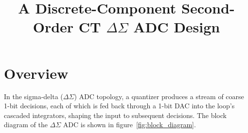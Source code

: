 \documentclass[12pt, a4paper]{article}
\title{A Discrete-Component Second-Order CT $\Delta\Sigma$ ADC Design}
\author{}
\date{}
\begin{document}
\maketitle
\tableofcontents
\newpage

\section{Overview}
\label{section:overview}

In the sigma-delta ($\Delta\Sigma$) ADC topology, a quantizer produces a stream of coarse 1-bit decisions, each of which is fed back through a 1-bit DAC into the loop's cascaded integrators, shaping the input to subsequent decisions. 
The block diagram of the $\Delta\Sigma$ ADC is shown in figure~\ref{fig:block_diagram}.
\end{document}
